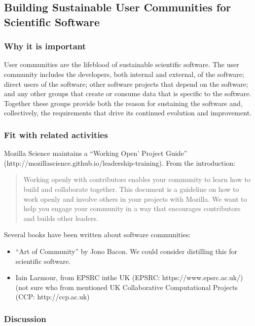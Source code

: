 \subsection{Building Sustainable User Communities for Scientific Software}

\subsubsection{Why it is important}

User communities are the lifeblood of sustainable scientific software. The user community includes the developers, 
both internal and external, of the software; direct users of the software; other software projects that depend on
the software; and any other groups that create or consume data that is specific to the software. Together these
groups provide both the reason for sustaining the software and, collectively, the requirements that drive its continued
evolution and improvement.

\subsubsection{Fit with related activities}

Mozilla Science maintains a ``Working Open' Project Guide'' (http://mozillascience.github.io/leadership-training). From the introduction:
\begin{quote}
Working openly with contributors enables your
    community to learn how to build and collaborate together. This
    document is a guideline on how to work openly and involve others
    in your projects with Mozilla. We want to help you engage your
    community in a way that encourages contributors and builds other
    leaders.
 \end{quote}

Several books have been written about software communities:
\begin{itemize}
\item ``Art of Community'' by Jono Bacon. We could consider distilling this for scientific software.
\item Iain Larmour, from EPSRC inthe UK (EPSRC: https://www.epsrc.ac.uk/) (not sure who from mentioned UK Collaborative Computational Projects (CCP: http://ccp.ac.uk)
\end{itemize}

\subsubsection{Discussion}

